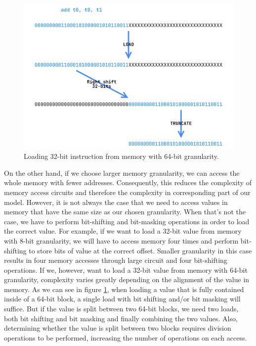 \documentclass[12pt]{article}
\begin{document}
\begin{figure}
    \includegraphics[width=\linewidth]{assets/64_bit_instruction_load.png}
    \centering
    \caption{Loading 32-bit instruction \cite{waterman2014risc} from memory with 64-bit granularity.}
    \label{fig:instruction_load_example}
\end{figure}

On the other hand, if we choose larger memory granularity, we can access the
whole memory with fewer addresses. Consequently, this reduces the complexity of
memory access circuits and therefore the complexity in corresponding part of
our model. However, it is not always the case that we need to access values in
memory that have the same size as our chosen granularity. When that's not the
case, we have to perform bit-shifting and bit-masking operations in order to
load the correct value. For example, if we want to load a 32-bit value from
memory with 8-bit granularity, we will have to access memory four times and
perform bit-shifting to store bits of value at the correct offset. Smaller
granularity in this case results in four memory accesses through large circuit
and four bit-shifting operations. If we, however, want to load a 32-bit value
from memory with 64-bit granularity, complexity varies greatly depending on the
alignment of the value in memory. As we can see in figure
\ref{fig:instruction_load_example}, when loading a value that is fully
contained inside of a 64-bit block, a single load with bit shifting and/or bit
masking will suffice. But if the value is split between two 64-bit blocks, we
need two loads, both bit shifting and bit masking and finally combining the two
values. Also, determining whether the value is split between two blocks
requires division operations to be performed, increasing the number of
operations on each access.
\end{document}
